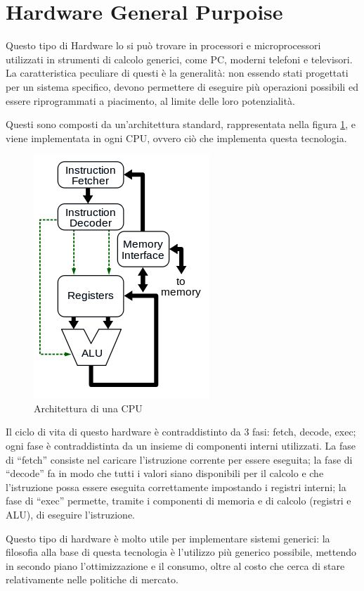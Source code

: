 \documentclass[a4paper,titlepage]{book}
\begin{document}
\section{Hardware General Purpoise}
Questo tipo di Hardware lo si può trovare in processori e microprocessori utilizzati in strumenti di calcolo generici, come PC, moderni telefoni e televisori. La caratteristica peculiare di questi è la generalità: non essendo stati progettati per un sistema specifico, devono permettere di eseguire più operazioni possibili ed essere riprogrammati a piacimento, al limite delle loro potenzialità.

Questi sono composti da un'architettura standard,  rappresentata nella figura  \ref{fig:0}, e viene implementata in ogni CPU, ovvero ciò che implementa questa tecnologia.

\begin{figure}
\centering
\includegraphics[scale=1]{cpu.png}
\caption{Architettura di una CPU}\label{fig:0}
\end{figure}

Il ciclo di vita di questo hardware è contraddistinto da 3 fasi: fetch, decode, exec; ogni fase è contraddistinta da un insieme di componenti interni utilizzati. La fase di ``fetch'' consiste nel caricare l'istruzione corrente per essere eseguita; la fase di ``decode'' fa in modo che tutti i valori siano disponibili per il calcolo e che l'istruzione possa essere eseguita correttamente impostando i registri interni; la fase di ``exec'' permette, tramite i componenti di memoria e di calcolo (registri e ALU), di eseguire l'istruzione.

Questo tipo di hardware è molto utile per implementare sistemi generici: la filosofia alla base di questa tecnologia è l'utilizzo più generico possibile, mettendo in secondo piano l'ottimizzazione e il consumo, oltre al costo che cerca di stare relativamente nelle politiche di mercato.
\end{document}
